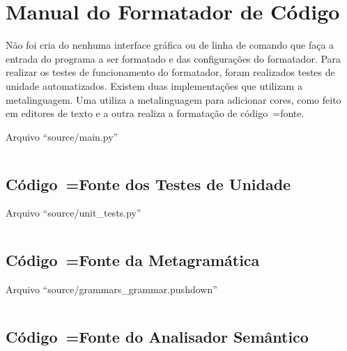 

\chapter{Manual do Formatador de Código}
\label{manualDoFormatadorDeCodigo}

Não foi cria do nenhuma interface gráfica ou
de linha de comando que faça a entrada do programa a ser formatado e
das configurações do formatador.
Para realizar os testes de funcionamento do formatador,
foram realizados testes de unidade automatizados.
Existem duas implementações que utilizam a metalinguagem.
Uma utiliza a metalinguagem para adicionar cores,
como feito em editores de texto e
a outra realiza a formatação de código~=fonte.

\begin{code}
\caption{Arquivo ``source/main.py''}
\label{main}
\inputminted[fontsize=\small,linenos=true,numberblanklines=true,breaklines=true]{antlr}{../source/main.py}
\end{code}


\section{Código~=Fonte dos Testes de Unidade}

\begin{code}
\caption{Arquivo ``source/unit\_tests.py''}
\label{unit_tests}
\inputminted[fontsize=\small,linenos=true,numberblanklines=true,breaklines=true]{python3}{../source/unit_tests.py}
\end{code}


\section{Código~=Fonte da Metagramática}

\begin{code}
\caption{Arquivo ``source/grammars\_grammar.pushdown''}
\label{grammars_grammar}
\inputminted[fontsize=\small,linenos=true,numberblanklines=true,breaklines=true]{python3}{../source/grammars_grammar.pushdown}
\end{code}


\section{Código~=Fonte do Analisador Semântico}

